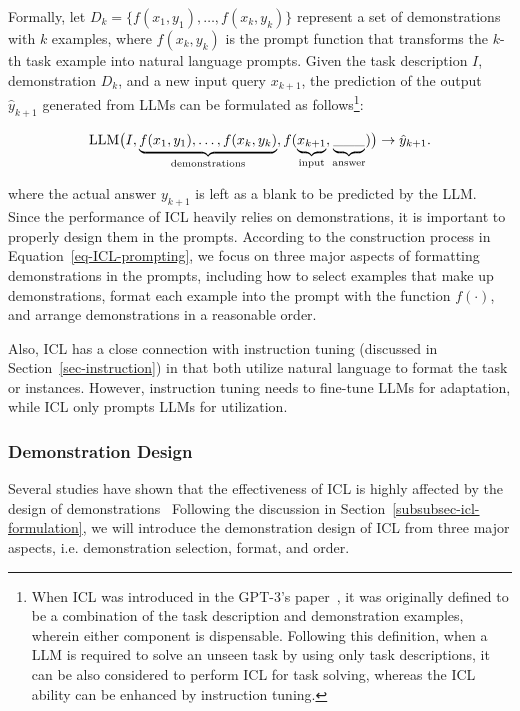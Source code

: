 {{{{{{Formally, let $D_k = \{ f(x_1, y_1), \dots, f(x_k, y_k) \}$ represent a set of demonstrations with $k$ examples, where $f(x_k, y_k)$ is the prompt function that transforms the $k$-th task example into natural language prompts. Given the task description $I$, demonstration $D_k$, and a new input query $x_{k+1}$, the prediction of the output $\hat{y}_{k+1}$ generated from LLMs can be formulated as follows\footnote{
When ICL was introduced in the GPT-3's paper~\cite{Brown-NeurIPS-2020-Language}, it was originally defined to be a combination of the task description and demonstration examples, wherein either component is dispensable. Following this definition, when a LLM is required to solve an unseen task by using only task descriptions, it can be also considered to perform ICL for task solving, whereas the ICL ability can be enhanced by instruction tuning. }:

\begin{equation}\label{eq-ICL-prompting}
     \text{LLM} \big(I, \underbrace{ f(x_1, y_1), \dots, f(x_k, y_k)}_{\text{demonstrations}}, f(\underbrace{x_{k+1}}_{\text{input}}, \underbrace{\vphantom{\hat{y}_{k+1}} \_\_\_}_{\text{answer}}) \big) \rightarrow \hat{y}_{k+1}.
\end{equation}

where the actual answer $y_{k+1}$ is left as a blank to be predicted by the  LLM. Since the performance of ICL heavily relies on demonstrations, it is important to properly design them in the prompts. According to the construction process in Equation~\eqref{eq-ICL-prompting}, we focus on three major aspects of formatting demonstrations in the prompts, including how to select examples that make up demonstrations, format each example into the prompt with the function $f(\cdot)$, and arrange demonstrations in a reasonable order.  

Also, ICL has a close connection with instruction tuning (discussed in Section~\ref{sec-instruction}) in that {both utilize natural language to format the task or instances}. However, instruction tuning needs to fine-tune LLMs for adaptation, while ICL only prompts LLMs for utilization.  

\subsubsection{Demonstration Design} {Several studies have shown that the effectiveness of ICL is highly affected by the design of demonstrations~\cite{Min-EMNLP-2022-Rethinking, Lu-ACL-2022-Fantasically,Zhao-ICML-2021-Calibrate}} Following the discussion in {Section~\ref{subsubsec-icl-formulation}}, we will introduce the demonstration design of ICL from three major aspects, i.e. demonstration selection, format, and order.

}}}}}}
